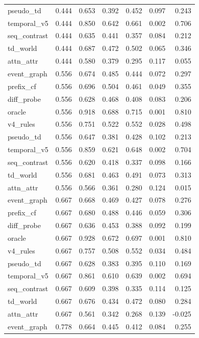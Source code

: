 \documentclass{article}
\begin{document}
\begin{longtable}{@{}lrrrrrr@{}}
pseudo\_td & 0.444 & 0.653 & 0.392 & 0.452 & 0.097 & 0.243 \\
temporal\_v5 & 0.444 & 0.850 & 0.642 & 0.661 & 0.002 & 0.706 \\
seq\_contrast & 0.444 & 0.635 & 0.441 & 0.357 & 0.084 & 0.212 \\
td\_world & 0.444 & 0.687 & 0.472 & 0.502 & 0.065 & 0.346 \\
attn\_attr & 0.444 & 0.580 & 0.379 & 0.295 & 0.117 & 0.055 \\
event\_graph & 0.556 & 0.674 & 0.485 & 0.444 & 0.072 & 0.297 \\
prefix\_cf & 0.556 & 0.696 & 0.504 & 0.461 & 0.049 & 0.355 \\
diff\_probe & 0.556 & 0.628 & 0.468 & 0.408 & 0.083 & 0.206 \\
oracle & 0.556 & 0.918 & 0.688 & 0.715 & 0.001 & 0.810 \\
v4\_rules & 0.556 & 0.751 & 0.522 & 0.552 & 0.028 & 0.498 \\
pseudo\_td & 0.556 & 0.647 & 0.381 & 0.428 & 0.102 & 0.213 \\
temporal\_v5 & 0.556 & 0.859 & 0.621 & 0.648 & 0.002 & 0.704 \\
seq\_contrast & 0.556 & 0.620 & 0.418 & 0.337 & 0.098 & 0.166 \\
td\_world & 0.556 & 0.681 & 0.463 & 0.491 & 0.073 & 0.313 \\
attn\_attr & 0.556 & 0.566 & 0.361 & 0.280 & 0.124 & 0.015 \\
event\_graph & 0.667 & 0.668 & 0.469 & 0.427 & 0.078 & 0.276 \\
prefix\_cf & 0.667 & 0.680 & 0.488 & 0.446 & 0.059 & 0.306 \\
diff\_probe & 0.667 & 0.636 & 0.453 & 0.388 & 0.092 & 0.199 \\
oracle & 0.667 & 0.928 & 0.672 & 0.697 & 0.001 & 0.810 \\
v4\_rules & 0.667 & 0.757 & 0.508 & 0.552 & 0.034 & 0.484 \\
pseudo\_td & 0.667 & 0.628 & 0.383 & 0.395 & 0.110 & 0.169 \\
temporal\_v5 & 0.667 & 0.861 & 0.610 & 0.639 & 0.002 & 0.694 \\
seq\_contrast & 0.667 & 0.609 & 0.398 & 0.335 & 0.114 & 0.125 \\
td\_world & 0.667 & 0.676 & 0.434 & 0.472 & 0.080 & 0.284 \\
attn\_attr & 0.667 & 0.561 & 0.342 & 0.268 & 0.139 & -0.025 \\
event\_graph & 0.778 & 0.664 & 0.445 & 0.412 & 0.084 & 0.255 \\

\end{longtable}
\end{document}
